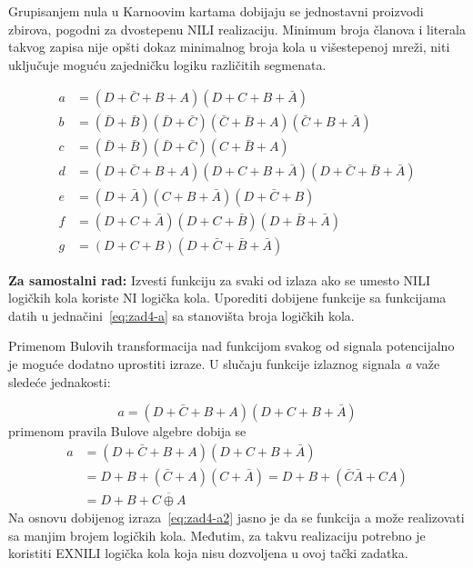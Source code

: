 \documentclass[a4paper,11pt]{article}
\numberwithin{equation}{section} %
\begin{document}
Grupisanjem nula u Karnoovim kartama dobijaju se jednostavni proizvodi zbirova, pogodni za dvostepenu NILI realizaciju. Minimum broja članova i literala takvog zapisa nije opšti dokaz minimalnog broja kola u višestepenoj mreži, niti uključuje moguću zajedničku logiku različitih segmenata.

\begin{equation}\label{eq:zad4-a}
\begin{aligned}
a &= (D + \bar{C} + B + A)(D + C + B + \bar{A}) \\[4pt]
b &= (\bar{D} + \bar{B})(\bar{D} + \bar{C})(\bar{C} + \bar{B} + A)(\bar{C} + B + \bar{A}) \\[4pt]
c &= (\bar{D} + \bar{B})(\bar{D} + \bar{C})(C + \bar{B} + A) \\[4pt]
d &= (D + \bar{C} + B + A)(D + C + B + \bar{A})(D + \bar{C} + \bar{B} + \bar{A}) \\[4pt]
e &= (D + \bar{A})(C + B + \bar{A})(D + \bar{C} + B) \\[4pt]
f &= (D + C + \bar{A})(D + C + \bar{B})(D + \bar{B} + \bar{A}) \\[4pt]
g &= (D + C + B)(D + \bar{C} + \bar{B} + \bar{A})
\end{aligned}
\end{equation}

\begin{tcolorbox}[colback=gray!10, colframe=black, boxrule=0.5pt]
\textbf{Za samostalni rad:} Izvesti funkciju za svaki od izlaza ako se umesto NILI logičkih kola
koriste NI logička kola. Uporediti dobijene funkcije sa funkcijama datih u jedna\v{c}ini~\eqref{eq:zad4-a} sa stanovišta broja
logičkih kola.
\end{tcolorbox}

Primenom Bulovih transformacija nad funkcijom svakog od signala potencijalno je
moguće dodatno uprostiti izraze. U slučaju funkcije izlaznog signala \textit{a} važe sledeće jednakosti:

\begin{equation}\label{eq:zad4-a1}
a = (D + \bar{C} + B + A)(D + C + B + \bar{A})
\end{equation}
primenom pravila Bulove algebre dobija se
\begin{equation}\label{eq:zad4-a2}
\begin{aligned}
a &= (D + \bar{C} + B + A)(D + C + B + \bar{A}) \\[4pt]
&=  D + B + (\bar{C} + A)(C + \bar{A}) = D + B + (\bar{C} \bar{A} + C A) \\[4pt]
&= D + B + \overline{C \oplus A}
\end{aligned}
\end{equation}
Na osnovu dobijenog izraza~\eqref{eq:zad4-a2} jasno je da se funkcija a može realizovati sa manjim brojem logičkih kola. Međutim, za takvu realizaciju potrebno je koristiti EXNILI logička kola koja nisu dozvoljena u ovoj tački zadatka.
\end{document}
